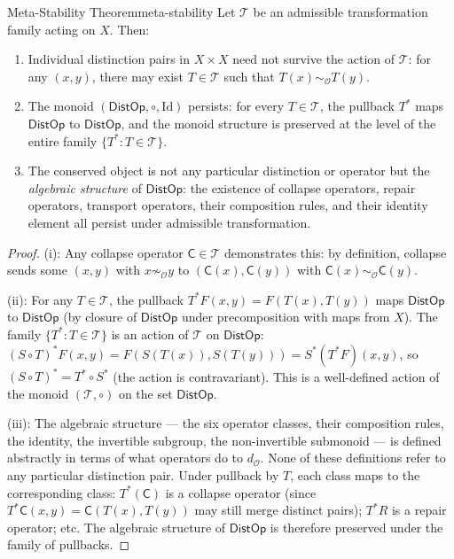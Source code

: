 \documentclass[12pt,twoside,openright]{book}
\newcommand{\transfam}{\mathcal{T}}       %
\newcommand{\distPairs}{X\times X}
\newcommand{\obs}{\mathcal{O}}
\newcommand{\distOp}{\mathsf{DistOp}}
\newcommand{\distMetric}{d_{\mathcal{O}}}
\providecommand{\collapOp}{\mathsf{C}}
\begin{document}
\begin{metatheorem}{Meta-Stability Theorem}{meta-stability}
Let $\transfam$ be an admissible transformation family acting
on $X$. Then:
\begin{enumerate}[nosep,label=(\roman*)]
\item Individual distinction pairs in $\distPairs$ need not
  survive the action of $\transfam$: for any $(x,y)$, there
  may exist $T\in\transfam$ such that $T(x)\sim_\obs T(y)$.
\item The monoid $(\distOp,\circ,\mathrm{Id})$ persists:
  for every $T\in\transfam$, the pullback $T^*$ maps $\distOp$
  to $\distOp$, and the monoid structure is preserved at the
  level of the entire family $\{T^*:T\in\transfam\}$.
\item The conserved object is not any particular distinction
  or operator but the \emph{algebraic structure} of $\distOp$:
  the existence of collapse operators, repair operators,
  transport operators, their composition rules, and their
  identity element all persist under admissible transformation.
\end{enumerate}
\begin{proof}
(i): Any collapse operator $\collapOp\in\transfam$ demonstrates
this: by definition, collapse sends some $(x,y)$ with
$x\not\sim_\obs y$ to $(\collapOp(x),\collapOp(y))$ with
$\collapOp(x)\sim_\obs\collapOp(y)$.

(ii): For any $T\in\transfam$, the pullback
$T^*F(x,y)=F(T(x),T(y))$ maps $\distOp$ to $\distOp$ (by
closure of $\distOp$ under precomposition with maps from $X$).
The family $\{T^*:T\in\transfam\}$ is an action of $\transfam$
on $\distOp$: $(S\circ T)^*F(x,y)=F(S(T(x)),S(T(y)))=
S^*(T^*F)(x,y)$, so $(S\circ T)^*=T^*\circ S^*$ (the action
is contravariant). This is a well-defined action of the monoid
$(\transfam,\circ)$ on the set $\distOp$.

(iii): The algebraic structure --- the six operator classes,
their composition rules, the identity, the invertible subgroup,
the non-invertible submonoid --- is defined abstractly in terms
of what operators do to $\distMetric$. None of these
definitions refer to any particular distinction pair. Under
pullback by $T$, each class maps to the corresponding class:
$T^*(\collapOp)$ is a collapse operator (since $T^*\collapOp(x,y)=
\collapOp(T(x),T(y))$ may still merge distinct pairs); $T^*R$
is a repair operator; etc. The algebraic structure of $\distOp$
is therefore preserved under the family of pullbacks.
\end{proof}
\end{metatheorem}
\end{document}
